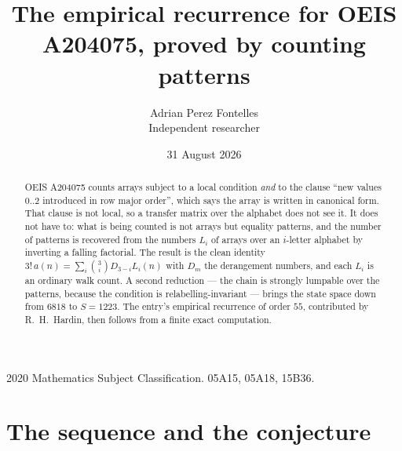 \documentclass[11pt,a4paper]{article}
\title{The empirical recurrence for OEIS A204075, proved by counting patterns}
\author{Adrian Perez Fontelles\\ \small Independent researcher}
\date{31 August 2026}
\theoremstyle{plain}
\theoremstyle{definition}
\begin{document}
\maketitle

\begin{abstract}
OEIS A204075 counts arrays subject to a local condition \emph{and} to the clause ``new values
$0..2$ introduced in row major order'', which says the array is written in canonical
form. That clause is not local, so a transfer matrix over the alphabet does not see it. It
does not have to: what is being counted is not arrays but equality patterns, and the number
of patterns is recovered from the numbers $L_i$ of arrays over an $i$-letter alphabet by
inverting a falling factorial. The result is the clean identity
$3!\,a(n)=\sum_i\binom{3}{i}D_{3-i}L_i(n)$ with $D_m$ the derangement numbers,
and each $L_i$ is an ordinary walk count. A second reduction --- the chain is strongly
lumpable over the patterns, because the condition is relabelling-invariant --- brings the
state space down from $6818$ to $S=1223$. The entry's empirical recurrence of order
$55$, contributed by R.~H.~Hardin, then follows from a finite exact computation.
\end{abstract}

\noindent\small 2020 Mathematics Subject Classification. 05A15, 05A18, 15B36.\normalsize

\section{The sequence and the conjecture}
\end{document}

